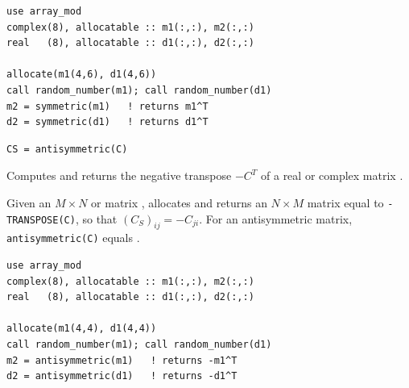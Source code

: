 \begin{description}[leftmargin=2.2cm, style=nextline]
\end{description}

\lstset{language=[95]Fortran}
\begin{lstlisting}
use array_mod
complex(8), allocatable :: m1(:,:), m2(:,:)
real   (8), allocatable :: d1(:,:), d2(:,:)

allocate(m1(4,6), d1(4,6))
call random_number(m1); call random_number(d1)
m2 = symmetric(m1)   ! returns m1^T
d2 = symmetric(d1)   ! returns d1^T
\end{lstlisting}


\lstset{language=[95]Fortran}
\begin{lstlisting}
CS = antisymmetric(C)
\end{lstlisting}

Computes and returns the negative transpose $-C^T$ of a real or complex matrix .

Given an $M\times N$  or  matrix ,  allocates and returns an $N\times M$ matrix  equal to \texttt{-TRANSPOSE(C)}, so that $(C_S)_{ij} = -C_{ji}$. For an antisymmetric matrix, \texttt{antisymmetric(C)} equals .

\begin{description}[leftmargin=2.2cm, style=nextline]
\end{description}

\lstset{language=[95]Fortran}
\begin{lstlisting}
use array_mod
complex(8), allocatable :: m1(:,:), m2(:,:)
real   (8), allocatable :: d1(:,:), d2(:,:)

allocate(m1(4,4), d1(4,4))
call random_number(m1); call random_number(d1)
m2 = antisymmetric(m1)   ! returns -m1^T
d2 = antisymmetric(d1)   ! returns -d1^T
\end{lstlisting}

